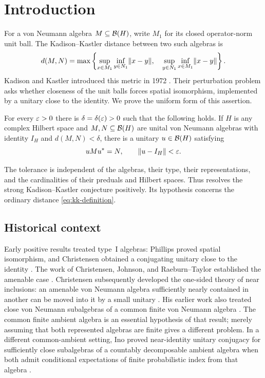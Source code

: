 \section{Introduction}
\label{sec:introduction}

For a von Neumann algebra $M\subseteq\mathcal B(H)$, write $M_1$ for its
closed operator-norm unit ball. The Kadison--Kastler distance between
two such algebras is
\begin{equation}\label{eq:kk-definition}
 d(M,N)=\max\left\{
 \sup_{x\in M_1}\inf_{y\in N_1}\lVert x-y\rVert,\quad
 \sup_{y\in N_1}\inf_{x\in M_1}\lVert x-y\rVert\right\}.
\end{equation}
Kadison and Kastler introduced this metric in 1972
\cite{KadisonKastler1972}. Their perturbation problem asks whether
closeness of the unit balls forces spatial isomorphism, implemented by
a unitary close to the identity. We prove the uniform form of this
assertion.

\begin{theorem}\label{thm:main}
For every $\varepsilon>0$ there is $\delta=\delta(\varepsilon)>0$ such that the
following holds. If $H$ is any complex Hilbert space and
$M,N\subseteq\mathcal B(H)$ are unital von Neumann algebras with identity
$I_H$ and $d(M,N)<\delta$, there is a unitary $u\in\mathcal B(H)$ satisfying
\[
 uMu^*=N,\qquad \lVert u-I_H\rVert<\varepsilon.
\]
\end{theorem}

The tolerance is independent of the algebras, their type, their
representations, and the cardinalities of their preduals and Hilbert
spaces. Thus  resolves the strong Kadison--Kastler
conjecture positively. Its hypothesis concerns the ordinary distance
\eqref{eq:kk-definition}.

\subsection{Historical context}

Early positive results treated type~I algebras:
Phillips proved spatial isomorphism, and Christensen obtained a conjugating
unitary close to the identity \cite{Phillips1974,Christensen1975}.
The work of Christensen, Johnson, and Raeburn--Taylor established the
amenable case \cite{Christensen1977,Johnson1977,RaeburnTaylor1977}.
Christensen subsequently developed the one-sided theory of near inclusions:
an amenable von Neumann algebra sufficiently nearly contained in another
can be moved into it by a small unitary \cite{Christensen1980}.
His earlier work also treated close von Neumann subalgebras of a common
finite von Neumann algebra \cite{Christensen1977II}. The common finite
ambient algebra is an essential hypothesis of that result; merely assuming
that both represented algebras are finite gives a different problem.
In a different common-ambient setting, Ino proved near-identity unitary
conjugacy for sufficiently close subalgebras of a countably decomposable
ambient algebra when both admit conditional expectations of finite
probabilistic index from that algebra \cite[Theorem~3.2]{Ino2016}.

